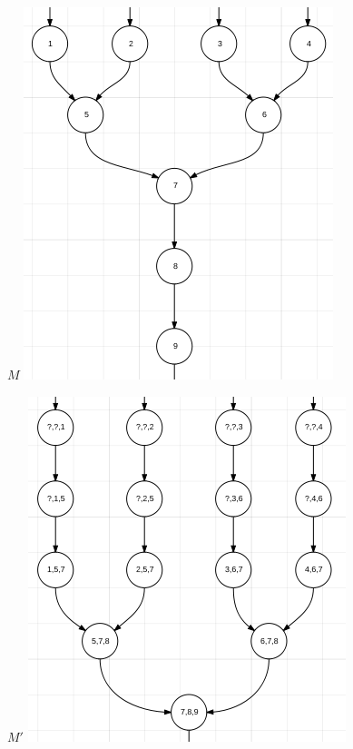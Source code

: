 \documentclass{article}
\begin{document}
\newpage

\begin{center}

$M$
\includegraphics[scale=0.85]{M.png}

\vspace{5em}

$M'$
\includegraphics[scale=0.85]{M_prime.png}

\end{center}

\section{}
\end{document}
